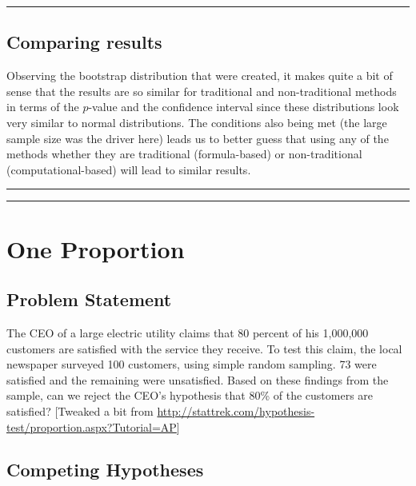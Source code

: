 \documentclass[]{tufte-book}
\let\oldrule=\rule
\renewcommand{\rule}[1]{\oldrule{\linewidth}}
\theoremstyle{definition}
\theoremstyle{definition}
\theoremstyle{remark}
\begin{document}
\begin{center}\rule{0.5\linewidth}{\linethickness}\end{center}

\subsection{Comparing results}\label{comparing-results}

Observing the bootstrap distribution that were created, it makes quite a
bit of sense that the results are so similar for traditional and
non-traditional methods in terms of the \(p\)-value and the confidence
interval since these distributions look very similar to normal
distributions. The conditions also being met (the large sample size was
the driver here) leads us to better guess that using any of the methods
whether they are traditional (formula-based) or non-traditional
(computational-based) will lead to similar results.

\begin{center}\rule{0.5\linewidth}{\linethickness}\end{center}

\begin{center}\rule{0.5\linewidth}{\linethickness}\end{center}

\section{One Proportion}\label{one-proportion}

\subsection{Problem Statement}\label{problem-statement-1}

The CEO of a large electric utility claims that 80 percent of his
1,000,000 customers are satisfied with the service they receive. To test
this claim, the local newspaper surveyed 100 customers, using simple
random sampling. 73 were satisfied and the remaining were unsatisfied.
Based on these findings from the sample, can we reject the CEO's
hypothesis that 80\% of the customers are satisfied? {[}Tweaked a bit
from
\url{http://stattrek.com/hypothesis-test/proportion.aspx?Tutorial=AP}{]}

\subsection{Competing Hypotheses}\label{competing-hypotheses-1}
\end{document}
